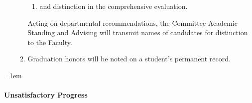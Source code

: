 \documentclass{manual}
\let\oldparagraph\paragraph
\renewcommand\paragraph{\leftskip=1em\oldparagraph}
\newcommand{\itemLevelA}{\alph*.}
\newcommand{\itemLevelB}{\arabic*)}
\newcommand{\itemRefA}{\alph*}
\newcommand{\itemRefB}{\arabic*}
\begin{document}
\begin{enumerate}[label=\itemLevelA,ref=\itemRefA]
\begin{enumerate}[label=\itemLevelB,ref=\itemRefB]
\begin{enumerate}[label=\alph*)]
\item and distinction in the comprehensive evaluation.
\end{enumerate}

Acting on departmental recommendations, the Committee Academic Standing and Advising will transmit names of candidates for distinction to the Faculty.

\item Graduation honors will be noted on a student's permanent record.
\end{enumerate}

\end{enumerate}

\paragraph{Unsatisfactory Progress}\label{par:UnsatisfactoryProgress}
\end{document}
